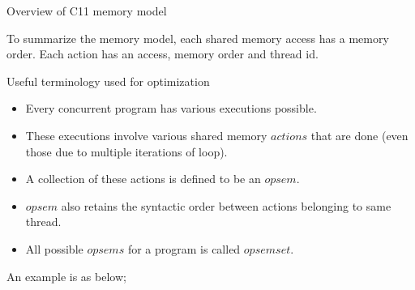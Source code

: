 \documentclass[notes, xcolor=dvipsnames]{beamer}
\begin{document}

    \begin{frame}{Overview of C11 memory model}
        
        To summarize the memory model, each shared memory access has a memory order. 
        Each action has an access, memory order and thread id. 
        \begin{figure}
        \end{figure}

    \end{frame}

    \begin{frame}{Useful terminology used for optimization}

        \begin{itemize}
            \item Every concurrent program has various executions possible. 
            \item These executions involve various shared memory $actions$ that are done (even those due to multiple iterations of loop).
            \item A collection of these actions is defined to be an $opsem$. 
            \item $opsem$ also retains the syntactic order between actions belonging to same thread.
            \item All possible $opsems$ for a program is called $opsemset$. 
        \end{itemize}

        An example is as below;
        \begin{figure}
        \end{figure}

    \end{frame}
\end{document}
